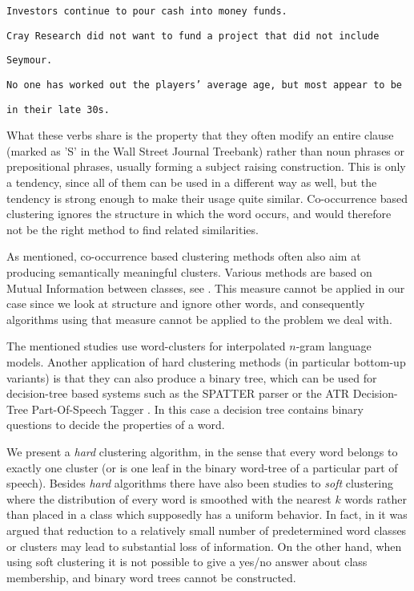\hspace*{4mm}
{\tt Investors continue to pour cash into money funds.}

\hspace*{4mm}
{\tt Cray Research did not want to fund a project that did not include}

\hspace*{4mm}
{\tt Seymour.}

\hspace*{4mm}
{\tt No one has worked out the players' average age, but most appear to be}

\hspace*{4mm}
{\tt in their late 30s.}

What these verbs share is the property that they often modify an entire clause
(marked as 'S' in the Wall Street Journal Treebank) rather than noun phrases or
prepositional phrases, usually forming a subject raising construction.  This is
only a tendency, since all of them can be used in a different way as well, but
the tendency is strong enough to make their usage quite similar. Co-occurrence
based clustering ignores the structure in which the word occurs, and would
therefore not be the right method to find related similarities.

As mentioned, co-occurrence based clustering methods often also aim at producing
semantically meaningful clusters. Various methods are based on Mutual
Information between classes, see
\cite{brown:clust,mcmahon96,kneser,jardino,martin,ueberla}. This measure cannot
be applied in our case since we look at structure and ignore other words, and
consequently algorithms using that measure cannot be applied to the problem we
deal with.

The mentioned studies use word-clusters for interpolated $n$-gram language
models. Another application of hard clustering methods (in particular bottom-up
variants) is that they can also produce a binary tree, which can be used for
decision-tree based systems such as the SPATTER parser \cite{magerman:acl} or
the ATR Decision-Tree Part-Of-Speech Tagger \cite{black:dtm,ushioda96}. In this
case a decision tree contains binary questions to decide the properties of a
word.

We present a {\em hard} clustering algorithm, in the sense that every word
belongs to exactly one cluster (or is one leaf in the binary word-tree of a
particular part of speech). Besides {\em hard} algorithms there have also been
studies to {\em soft} clustering \cite{pereira:clust,dagan:sym} where the
distribution of every word is smoothed with the nearest $k$ words rather than
placed in a class which supposedly has a uniform behavior. In fact, in
\cite{dagan:context} it was argued that reduction to a relatively small number
of predetermined word classes or clusters may lead to substantial loss of
information. On the other hand, when using soft clustering it is not possible to
give a yes/no answer about class membership, and binary word trees cannot be
constructed.

